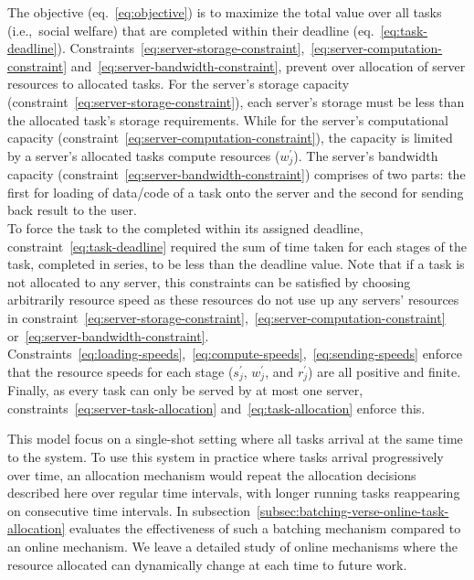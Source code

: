 The objective (eq.~\ref{eq:objective}) is to maximize the total value over all tasks (i.e.,\ social welfare) that
are completed within their deadline (eq.~\ref{eq:task-deadline}).
Constraints~\ref{eq:server-storage-constraint},~\ref{eq:server-computation-constraint}
and~\ref{eq:server-bandwidth-constraint}, prevent over allocation of server resources to allocated tasks.
For the server's storage capacity (constraint~\ref{eq:server-storage-constraint}), each server's storage must be less
than the allocated task's storage requirements. While for the server's computational capacity
(constraint~\ref{eq:server-computation-constraint}), the capacity is limited by a server's allocated tasks
compute resources ($w^{'}_j$). The server's bandwidth capacity (constraint~\ref{eq:server-bandwidth-constraint})
comprises of two parts: the first for loading of data/code of a task onto the server and the second for sending
back result to the user. \\
To force the task to the completed within its assigned deadline, constraint~\ref{eq:task-deadline} required the sum
of time taken for each stages of the task, completed in series, to be less than the deadline value.
Note that if a task is not allocated to any server, this constraints can be satisfied by choosing arbitrarily
resource speed as these resources do not use up any servers' resources in
constraint~\ref{eq:server-storage-constraint},~\ref{eq:server-computation-constraint}
or~\ref{eq:server-bandwidth-constraint}. \\
Constraints~\ref{eq:loading-speeds},~\ref{eq:compute-speeds},~\ref{eq:sending-speeds} enforce that the resource
speeds for each stage ($s^{'}_j$, $w^{'}_j$, and $r^{'}_j$) are all positive and finite.
Finally, as every task can only be served by at most one server, constraints~\ref{eq:server-task-allocation}
and~\ref{eq:task-allocation} enforce this.

This model focus on a single-shot setting where all tasks arrival at the same time to the system. To use this system
in practice where tasks arrival progressively over time, an allocation mechanism would repeat the allocation decisions
described here over regular time intervals, with longer running tasks reappearing on consecutive time intervals.
In subsection~\ref{subsec:batching-verse-online-task-allocation} evaluates the effectiveness of such a batching mechanism
compared to an online mechanism. We leave a detailed study of online mechanisms where the resource allocated can
dynamically change at each time to future work.

